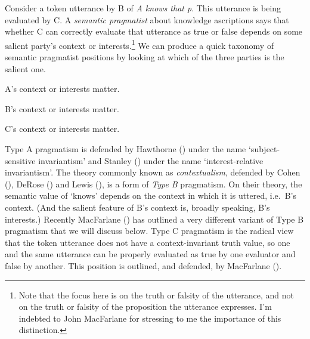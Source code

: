 \documentclass[
  11pt,
  letterpaper,
  DIV=11,
  numbers=noendperiod,
  twoside]{scrartcl}
\providecommand{\tightlist}{%
  \setlength{\itemsep}{0pt}\setlength{\parskip}{0pt}}
\begin{document}
Consider a token utterance by B of \emph{A knows that p}. This utterance
is being evaluated by C. A \emph{semantic pragmatist} about knowledge
ascriptions says that whether C can correctly evaluate that utterance as
true or false depends on some salient party's context or
interests.\footnote{Note that the focus here is on the truth or falsity
  of the utterance, and not on the truth or falsity of the proposition
  the utterance expresses. I'm indebted to John MacFarlane for stressing
  to me the importance of this distinction.} We can produce a quick
taxonomy of semantic pragmatist positions by looking at which of the
three parties is the salient one.

\begin{description}
\tightlist
\item[Type A pragmatism]
A's context or interests matter.
\item[Type B pragmatism]
B's context or interests matter.
\item[Type C pragmatism]
C's context or interests matter.
\end{description}

Type A pragmatism is defended by Hawthorne
() under the name `subject-sensitive
invariantism' and Stanley ()
under the name `interest-relative invariantism'. The theory commonly
known as \emph{contextualism}, defended by Cohen
(), DeRose
() and Lewis
(), is a form of \emph{Type B}
pragmatism. On their theory, the semantic value of `knows' depends on
the context in which it is uttered, i.e.~B's context. (And the salient
feature of B's context is, broadly speaking, B's interests.) Recently
MacFarlane () has outlined a
very different variant of Type B pragmatism that we will discuss below.
Type C pragmatism is the radical view that the token utterance does not
have a context-invariant truth value, so one and the same utterance can
be properly evaluated as true by one evaluator and false by another.
This position is outlined, and defended, by MacFarlane
().
\end{document}
